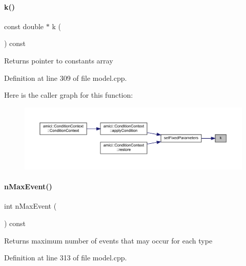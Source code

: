 \paragraph{\texorpdfstring{k()}{k()}}
{\footnotesize\ttfamily const double $\ast$ k (\begin{DoxyParamCaption}{ }\end{DoxyParamCaption}) const}

\begin{DoxyReturn}{Returns}
pointer to constants array 
\end{DoxyReturn}


Definition at line 309 of file model.\+cpp.

Here is the caller graph for this function\+:
\nopagebreak
\begin{figure}[H]
\begin{center}
\leavevmode
\includegraphics[width=350pt]{classamici_1_1_model_adde50e0d8a99d20354c8403bf93fab6f_icgraph}
\end{center}
\end{figure}
\mbox{\label{classamici_1_1_model_ac6ea00eafac9ec7be198bca04b19f4c3}} 
\paragraph{\texorpdfstring{nMaxEvent()}{nMaxEvent()}}
{\footnotesize\ttfamily int n\+Max\+Event (\begin{DoxyParamCaption}{ }\end{DoxyParamCaption}) const}

\begin{DoxyReturn}{Returns}
maximum number of events that may occur for each type 
\end{DoxyReturn}


Definition at line 313 of file model.\+cpp.

\mbox{\label{classamici_1_1_model_a35f06fdd341805405b851788ffe981c4}} 
